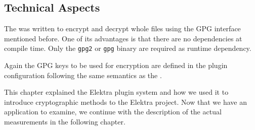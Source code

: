 
\subsection{Technical Aspects}



The \fcrypt{} was written to encrypt and decrypt whole files using the GPG interface mentioned before.
One of its advantages is that there are no dependencies at compile time.
Only the \texttt{gpg2} or \texttt{gpg} binary are required as runtime dependency.

Again the GPG keys to be used for encryption are defined in the plugin configuration following the same semantics as the \crypto{}.


This chapter explained the Elektra plugin system and how we used it to introduce cryptographic methods to the Elektra project.
Now that we have an application to examine, we continue with the description of the actual measurements in the following chapter.
